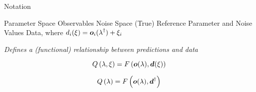 \begin{block}{Notation}

    \begin{itemize}
        \itembox{$\pspace$} Parameter Space
         Observables
         Noise Space
        \itembox{$\param^\dagger, \noise^\dagger$} (True) Reference Parameter and Noise Values
         Data, where $d_i(\operatorname*{\xi}) = \boldsymbol{o}_i(\operatorname*{\lambda}^\dagger) + \xi_i$
    \end{itemize}


    \emph{Defines a (functional) relationship between predictions and data}

    \begin{equation}
        Q \left (\operatorname*{\lambda}, \operatorname*{\xi} \right ) = F \left ( \boldsymbol{o}(\operatorname*{\lambda}), \boldsymbol{d}(\operatorname*{\xi}) \right )
    \end{equation} 

    \begin{equation}
        Q \left (\operatorname*{\lambda} \right ) = F \left ( \boldsymbol{o}(\operatorname*{\lambda}), \boldsymbol{d}^\dagger \right )
    \end{equation}

\end{block}



